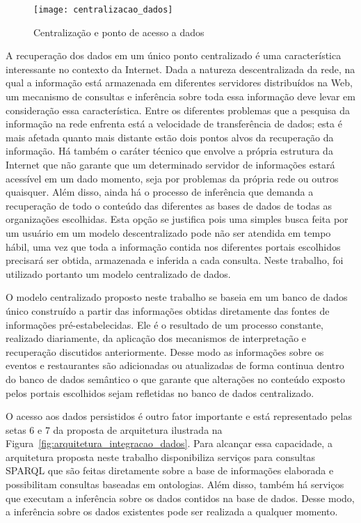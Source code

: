 \begin{figure}[!ht]
  \centering
  \texttt{[image: centralizacao\_dados]} 
  \caption{Centralização e ponto de acesso a dados}
  \label{fig:centralizacao_dados} 
\end{figure}

A recuperação dos dados em um único ponto centralizado é uma característica interessante no contexto da Internet. Dada a natureza descentralizada da rede, na qual a informação está armazenada em diferentes servidores distribuídos na Web, um mecanismo de consultas e inferência sobre toda essa informação deve levar em consideração essa característica. Entre os diferentes problemas que a pesquisa da informação na rede enfrenta está a velocidade de transferência de dados; esta é mais afetada quanto mais distante estão dois pontos alvos da recuperação da informação. Há também o caráter técnico que envolve a própria estrutura da Internet que não garante que um determinado servidor de informações estará acessível em um dado momento, seja por problemas da própria rede ou outros quaisquer. Além disso, ainda há o processo de inferência que demanda a recuperação de todo o conteúdo das diferentes as bases de dados de todas as organizações escolhidas. Esta opção se justifica pois  uma simples busca feita por um usuário em um modelo descentralizado pode não ser atendida em tempo hábil, uma vez que toda a informação contida nos diferentes portais escolhidos precisará ser obtida, armazenada e inferida a cada consulta. Neste trabalho, foi utilizado portanto um modelo centralizado de dados.

O modelo centralizado proposto neste trabalho se baseia em um banco de dados único construído a partir das informações obtidas diretamente das fontes de informações pré-estabelecidas. Ele é o resultado de um processo constante, realizado diariamente, da aplicação dos mecanismos de interpretação e recuperação discutidos anteriormente. Desse modo as informações sobre os eventos e restaurantes são adicionadas ou atualizadas de forma continua dentro do banco de dados semântico o que garante que alterações no conteúdo exposto pelos portais escolhidos sejam refletidas no banco de dados centralizado.

O acesso aos dados persistidos é outro fator importante e está representado pelas setas 6 e 7 da proposta de arquitetura ilustrada na Figura~\ref{fig:arquitetura_integracao_dados}. Para alcançar essa capacidade, a arquitetura proposta neste trabalho disponibiliza serviços para consultas SPARQL que são feitas diretamente sobre a base de informações elaborada e possibilitam consultas baseadas em ontologias. Além disso, também há serviços que executam a inferência sobre os dados contidos na base de dados. Desse modo, a inferência sobre os dados existentes pode ser realizada a qualquer momento.

